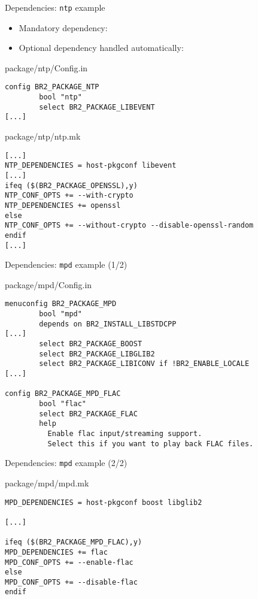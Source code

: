 \begin{frame}[fragile]{Dependencies: {\tt ntp} example}

  \begin{itemize}
  \item Mandatory dependency: 
  \item Optional dependency handled automatically: 
  \end{itemize}

\begin{block}{package/ntp/Config.in}
{\scriptsize
\begin{verbatim}
config BR2_PACKAGE_NTP
        bool "ntp"
        select BR2_PACKAGE_LIBEVENT
[...]
\end{verbatim}}
\end{block}

\begin{block}{package/ntp/ntp.mk}
\begin{verbatim}
[...]
NTP_DEPENDENCIES = host-pkgconf libevent
[...]
ifeq ($(BR2_PACKAGE_OPENSSL),y)
NTP_CONF_OPTS += --with-crypto
NTP_DEPENDENCIES += openssl
else
NTP_CONF_OPTS += --without-crypto --disable-openssl-random
endif
[...]
\end{verbatim}
\end{block}

\end{frame}

\begin{frame}[fragile]{Dependencies: {\tt mpd} example (1/2)}

\begin{block}{package/mpd/Config.in}
{\scriptsize
\begin{verbatim}
menuconfig BR2_PACKAGE_MPD
        bool "mpd"
        depends on BR2_INSTALL_LIBSTDCPP
[...]
        select BR2_PACKAGE_BOOST
        select BR2_PACKAGE_LIBGLIB2
        select BR2_PACKAGE_LIBICONV if !BR2_ENABLE_LOCALE
[...]

config BR2_PACKAGE_MPD_FLAC
        bool "flac"
        select BR2_PACKAGE_FLAC
        help
          Enable flac input/streaming support.
          Select this if you want to play back FLAC files.

\end{verbatim}}
\end{block}

\end{frame}

\begin{frame}[fragile]{Dependencies: {\tt mpd} example (2/2)}

\begin{block}{package/mpd/mpd.mk}
\begin{verbatim}
MPD_DEPENDENCIES = host-pkgconf boost libglib2

[...]

ifeq ($(BR2_PACKAGE_MPD_FLAC),y)
MPD_DEPENDENCIES += flac
MPD_CONF_OPTS += --enable-flac
else
MPD_CONF_OPTS += --disable-flac
endif
\end{verbatim}
\end{block}

\end{frame}


